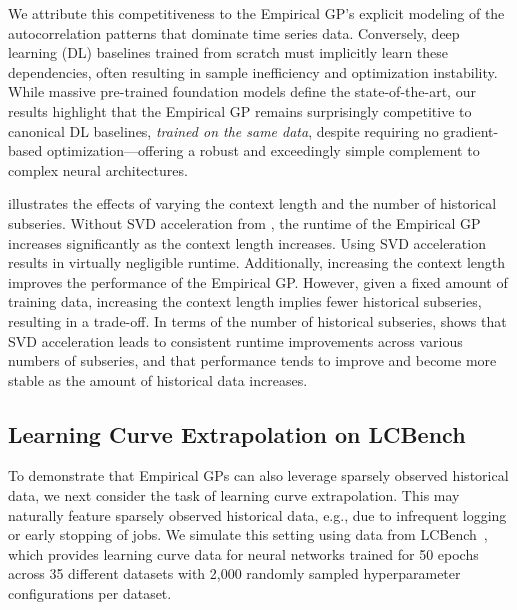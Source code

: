 \documentclass{article}
\begin{document}

We attribute this competitiveness to the Empirical GP's explicit modeling of the autocorrelation patterns that dominate time series data. Conversely, deep learning (DL) baselines trained from scratch must implicitly learn these dependencies, often resulting in sample inefficiency and optimization instability. While massive pre-trained foundation models define the state-of-the-art, our results highlight that the Empirical GP remains surprisingly competitive to canonical DL baselines, {\it trained on the same data},
despite requiring no gradient-based optimization—offering a robust and exceedingly simple complement to complex neural architectures.

 illustrates the effects of varying the context length and the number of historical subseries.
Without SVD acceleration from , the runtime of the Empirical GP increases significantly as the context length increases.
Using SVD acceleration results in virtually negligible runtime.
Additionally, increasing the context length improves the performance of the Empirical GP.
However, given a fixed amount of training data, increasing the context length implies fewer historical subseries, resulting in a trade-off.
In terms of the number of historical subseries,  shows that SVD acceleration leads to consistent runtime improvements across various numbers of subseries, and that performance tends to improve and become more stable as the amount of historical data increases.

\subsection{Learning Curve Extrapolation on LCBench}
\label{sec:lcbench_experiments}
To demonstrate that Empirical GPs can also leverage sparsely observed historical data,
we next consider the task of learning curve extrapolation.
This may naturally feature sparsely observed historical data, e.g., due to infrequent logging or early stopping of jobs.
We simulate this setting using data from LCBench~\citep{zimmer2021auto}, which provides learning curve data for neural networks trained for 50 epochs across 35 different datasets with 2,000 randomly sampled hyperparameter configurations per dataset.
\end{document}
